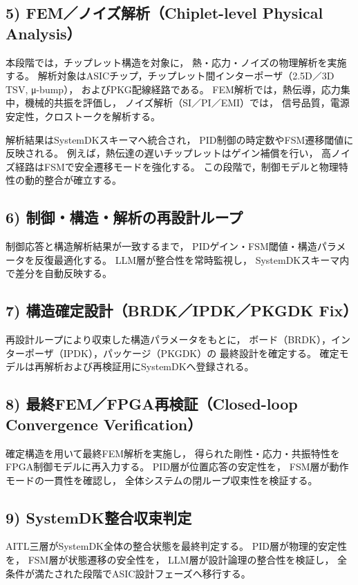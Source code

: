 \subsection{5) FEM／ノイズ解析（Chiplet-level Physical Analysis）}
本段階では，チップレット構造を対象に，
熱・応力・ノイズの物理解析を実施する。
解析対象はASICチップ，チップレット間インターポーザ（2.5D／3D TSV, μ-bump），
およびPKG配線経路である。
FEM解析では，熱伝導，応力集中，機械的共振を評価し，
ノイズ解析（SI／PI／EMI）では，
信号品質，電源安定性，クロストークを解析する。

解析結果はSystemDKスキーマへ統合され，
PID制御の時定数やFSM遷移閾値に反映される。
例えば，熱伝達の遅いチップレットはゲイン補償を行い，
高ノイズ経路はFSMで安全遷移モードを強化する。
この段階で，制御モデルと物理特性の動的整合が確立する。

\subsection{6) 制御・構造・解析の再設計ループ}
制御応答と構造解析結果が一致するまで，
PIDゲイン・FSM閾値・構造パラメータを反復最適化する。
LLM層が整合性を常時監視し，
SystemDKスキーマ内で差分を自動反映する。

\subsection{7) 構造確定設計（BRDK／IPDK／PKGDK Fix）}
再設計ループにより収束した構造パラメータをもとに，
ボード（BRDK），インターポーザ（IPDK），パッケージ（PKGDK）の
最終設計を確定する。
確定モデルは再解析および再検証用にSystemDKへ登録される。

\subsection{8) 最終FEM／FPGA再検証（Closed-loop Convergence Verification）}
確定構造を用いて最終FEM解析を実施し，
得られた剛性・応力・共振特性をFPGA制御モデルに再入力する。
PID層が位置応答の安定性を，
FSM層が動作モードの一貫性を確認し，
全体システムの閉ループ収束性を検証する。

\subsection{9) SystemDK整合収束判定}
AITL三層がSystemDK全体の整合状態を最終判定する。
PID層が物理的安定性を，
FSM層が状態遷移の安全性を，
LLM層が設計論理の整合性を検証し，
全条件が満たされた段階でASIC設計フェーズへ移行する。

